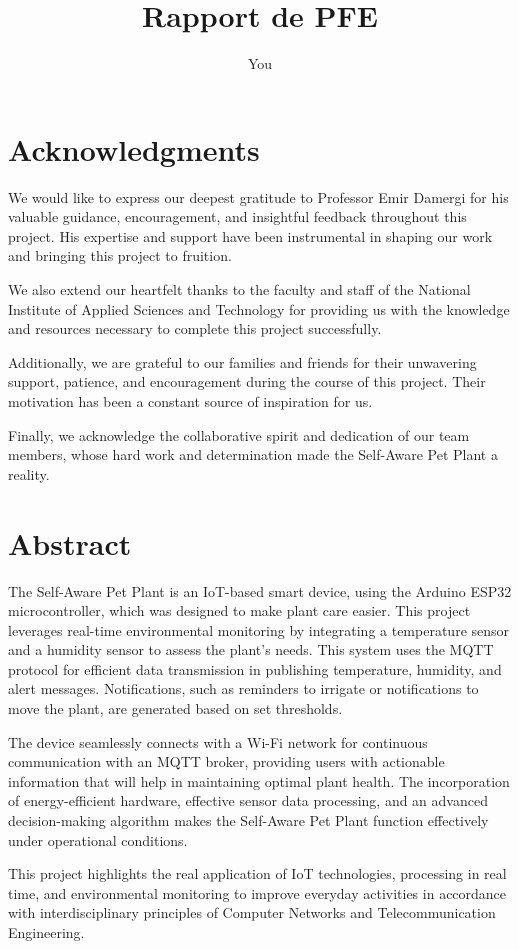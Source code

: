 \documentclass[12pt,a4paper,oneside,english]{book}
\author{You}
\title{Rapport de PFE}
\begin{document}

\chapter*{Acknowledgments}
We would like to express our deepest gratitude to Professor Emir Damergi for his valuable guidance, encouragement, and insightful feedback throughout this project. His expertise and support have been instrumental in shaping our work and bringing this project to fruition.

We also extend our heartfelt thanks to the faculty and staff of the National Institute of Applied Sciences and Technology for providing us with the knowledge and resources necessary to complete this project successfully.

Additionally, we are grateful to our families and friends for their unwavering support, patience, and encouragement during the course of this project. Their motivation has been a constant source of inspiration for us.

Finally, we acknowledge the collaborative spirit and dedication of our team members, whose hard work and determination made the Self-Aware Pet Plant a reality.


\frontmatter
\chapter*{Abstract}
\normalsize{
    The Self-Aware Pet Plant is an IoT-based smart device, using the Arduino ESP32 microcontroller, which was designed to make plant care easier. This project leverages real-time environmental monitoring by integrating a temperature sensor and a humidity sensor to assess the plant's needs. This system uses the MQTT protocol for efficient data transmission in publishing temperature, humidity, and alert messages. Notifications, such as reminders to irrigate or notifications to move the plant, are generated based on set thresholds.

    The device seamlessly connects with a Wi-Fi network for continuous communication with an MQTT broker, providing users with actionable information that will help in maintaining optimal plant health. The incorporation of energy-efficient hardware, effective sensor data processing, and an advanced decision-making algorithm makes the Self-Aware Pet Plant function effectively under operational conditions.
    
    This project highlights the real application of IoT technologies, processing in real time, and environmental monitoring to improve everyday activities in accordance with interdisciplinary principles of Computer Networks and Telecommunication Engineering.
}
\end{document}
